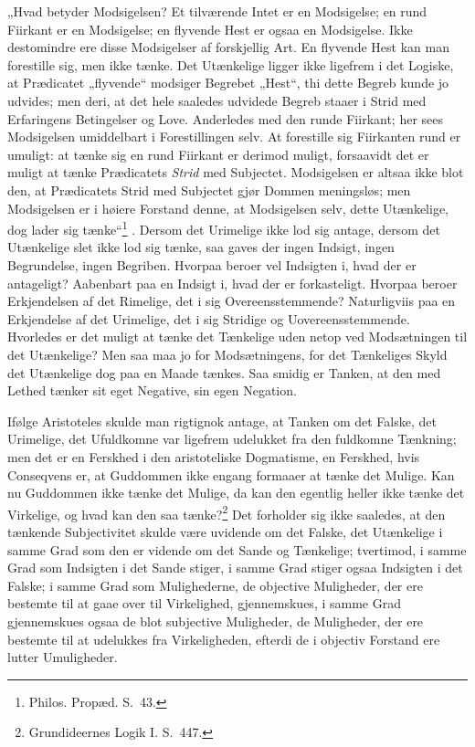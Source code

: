 \documentclass[12pt]{book}
\newcommand{\opage}[1]{\marginnote{\footnotesize\textit{[#1]}}}
\begin{document}
„Hvad betyder Modsigelsen? Et tilværende Intet er en Modsigelse; en rund Fiirkant er en Modsigelse; en flyvende Hest er ogsaa en Modsigelse. Ikke destomindre ere disse Modsigelser af forskjellig Art. En flyvende Hest kan man forestille sig, men ikke tænke. Det Utænkelige ligger ikke
\opage{241}ligefrem i det Logiske, at Prædicatet „flyvende“ modsiger Begrebet
„Hest“, thi dette Begreb kunde jo udvides; men deri,
at det hele saaledes udvidede Begreb staaer i Strid med
Erfaringens Betingelser og Love. Anderledes med den runde
Fiirkant; her sees Modsigelsen umiddelbart i Forestillingen
selv. At forestille sig Fiirkanten rund er umuligt: at tænke
sig en rund Fiirkant er derimod muligt, forsaavidt det er
muligt at tænke Prædicatets \emph{Strid} med Subjectet. Modsigelsen
er altsaa ikke blot den, at Prædicatets Strid med
Subjectet gjør Dommen meningsløs; men Modsigelsen er i
høiere Forstand denne, at Modsigelsen selv, dette Utænkelige,
dog lader sig tænke“\footnote{Philos. Propæd. S.~43.}%
. Dersom det Urimelige ikke lod sig
antage, dersom det Utænkelige slet ikke lod sig tænke, saa
gaves der ingen Indsigt, ingen Begrundelse, ingen Begriben.
Hvorpaa beroer vel Indsigten i, hvad der er antageligt?
Aabenbart paa en Indsigt i, hvad der er forkasteligt. Hvorpaa
beroer Erkjendelsen af det Rimelige, det i sig Overeensstemmende?
Naturligviis paa en Erkjendelse af det Urimelige, det
i sig Stridige og Uovereensstemmende. Hvorledes er det
muligt at tænke det Tænkelige uden netop ved Modsætningen
til det Utænkelige? Men saa maa jo for Modsætningens, for
det Tænkeliges Skyld det Utænkelige dog paa en Maade
tænkes. Saa smidig er Tanken, at den med Lethed tænker
sit eget Negative, sin egen Negation.

Ifølge Aristoteles skulde man rigtignok antage, at Tanken
om det Falske, det Urimelige, det Ufuldkomne var ligefrem
udelukket fra den fuldkomne Tænkning; men det er en Ferskhed
i den aristoteliske Dogmatisme, en Ferskhed, hvis Conseqvens
er, at Guddommen ikke engang formaaer at tænke det
Mulige. Kan nu Guddommen ikke tænke det Mulige, da
kan den egentlig heller ikke tænke det Virkelige, og hvad kan
\opage{242}den saa tænke?\footnote{Grundideernes Logik I. S.~447.}%
{} Det forholder sig ikke saaledes, at den
tænkende Subjectivitet skulde være uvidende om det Falske, det
Utænkelige i samme Grad som den er vidende om det Sande
og Tænkelige; tvertimod, i samme Grad som Indsigten i det
Sande stiger, i samme Grad stiger ogsaa Indsigten i det
Falske; i samme Grad som Mulighederne, de objective Muligheder,
der ere bestemte til at gaae over til Virkelighed, gjennemskues,
i samme Grad gjennemskues ogsaa de blot subjective
Muligheder, de Muligheder, der ere bestemte til at udelukkes
fra Virkeligheden, efterdi de i objectiv Forstand ere lutter
Umuligheder.
\end{document}
